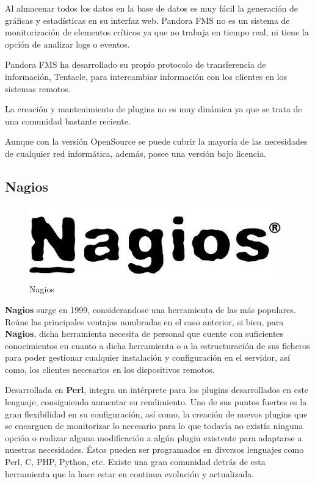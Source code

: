 Al almacenar todos los datos en la base de datos es muy fácil la generación de
gráficas y estadísticas en su interfaz web. Pandora FMS no es un sistema de
monitorización de elementos críticos ya que no trabaja en tiempo real, ni tiene la opción de analizar logs o eventos. 

Pandora FMS ha desarrollado su propio protocolo de transferencia de información, Tentacle, para intercambiar información con los clientes en los sistemas remotos.

La creación y mantenimiento de plugins no es muy dinámica ya que se trata de una comunidad bastante reciente.

Aunque con la versión OpenSource se puede cubrir la mayoría de las
necesidades de cualquier red informática, además, posee una versión bajo licencia.
\newpage
\subsection{Nagios}
\begin{figure}[H]
	\centering
	\includegraphics[scale=0.4]{imagenes/logos_monitorizacion/nagios.jpeg}
	\caption{Nagios} \label{nagios}
	
\end{figure}

\textbf{Nagios}\cite{nagios} surge en 1999, considerandose una herramienta de las más populares. Reúne las principales ventajas nombradas en el caso anterior, si bien, para \textbf{Nagios}, dicha herramienta necesita de personal que cuente con suficientes conocimientos en cuanto a dicha herramienta o a la estructuración de sus ficheros para poder gestionar cualquier instalación y configuración en el servidor, así como, los clientes necesarios en los dispositivos remotos.

Desarrollada en \textbf{Perl}, integra un intérprete para los plugins desarrollados en este lenguaje, consiguiendo aumentar su rendimiento.
Uno de sus puntos fuertes es la gran flexibilidad en su configuración, así como, la creación de nuevos plugins que se encarguen de monitorizar lo necesario para lo que todavía no existía ninguna opción o realizar alguna modificación a algún plugin existente para adaptarse a nuestras necesidades. Éstos pueden ser programados en diversos lenguajes como Perl, C, PHP, Python, etc. Existe una gran comunidad detrás de esta herramienta que la hace estar en continua evolución y actualizada.

